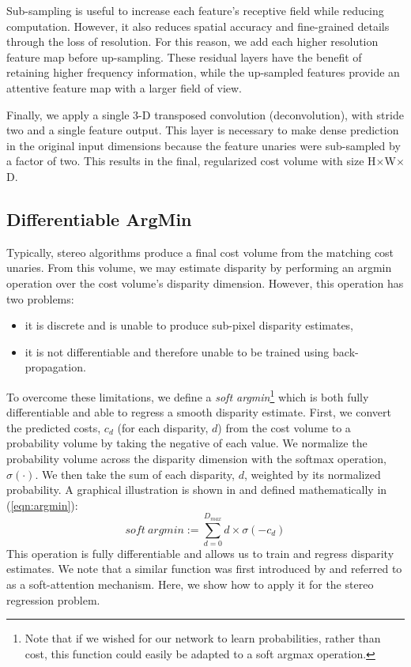 Sub-sampling is useful to increase each feature's receptive field while reducing computation. However, it also reduces spatial accuracy and fine-grained details through the loss of resolution. For this reason, we add each higher resolution feature map before up-sampling. These residual layers have the benefit of retaining higher frequency information, while the up-sampled features provide an attentive feature map with a larger field of view.

Finally, we apply a single 3-D transposed convolution (deconvolution), with stride two and a single feature output. This layer is necessary to make dense prediction in the original input dimensions because the feature unaries were sub-sampled by a factor of two. This results in the final, regularized cost volume with size H$\times$W$\times$D.

\subsection{Differentiable ArgMin}
\label{sec:argmin}

Typically, stereo algorithms produce a final cost volume from the matching cost unaries. From this volume, we may estimate disparity by performing an argmin operation over the cost volume’s disparity dimension. However, this operation has two problems:
\begin{itemize}[noitemsep]
\item it is discrete and is unable to produce sub-pixel disparity estimates,
\item it is not differentiable and therefore unable to be trained using back-propagation.
\end{itemize}
To overcome these limitations, we define a \textit{soft argmin}\footnote{Note that if we wished for our network to learn probabilities, rather than cost, this function could easily be adapted to a soft argmax operation.} which is both fully differentiable and able to regress a smooth disparity estimate. First, we convert the predicted costs, $c_d$ (for each disparity, $d$) from the cost volume to a probability volume by taking the negative of each value. We normalize the probability volume across the disparity dimension with the softmax operation, $\sigma (\cdot)$. We then take the sum of each disparity, $d$, weighted by its normalized probability. A graphical illustration is shown in  and defined mathematically in (\ref{eqn:argmin}):
\begin{equation}
soft~argmin := \sum_{d=0}^{D_{max}} d \times \sigma (-c_d)
\label{eqn:argmin}
\end{equation}
This operation is fully differentiable and allows us to train and regress disparity estimates. We note that a similar function was first introduced by \citep{bahdanau2014neural} and referred to as a soft-attention mechanism. Here, we show how to apply it for the stereo regression problem.

